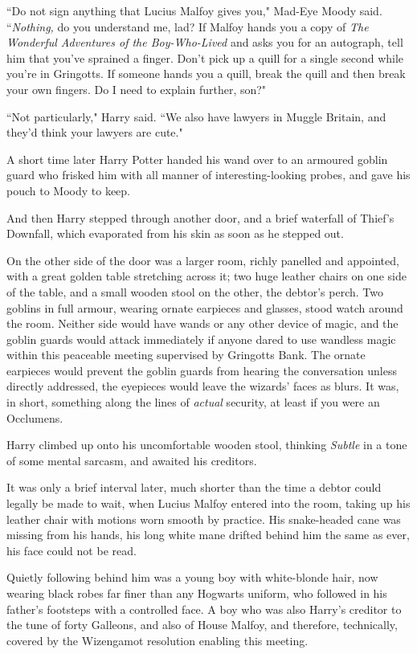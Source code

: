 ``Do not sign anything that Lucius Malfoy gives you," Mad-Eye Moody said. ``\emph{Nothing,} do you understand me, lad? If Malfoy hands you a copy of \emph{The Wonderful Adventures of the Boy-Who-Lived} and asks you for an autograph, tell him that you've sprained a finger. Don't pick up a quill for a single second while you're in Gringotts. If someone hands you a quill, break the quill and then break your own fingers. Do I need to explain further, son?"

``Not particularly," Harry said. ``We also have lawyers in Muggle Britain, and they'd think your lawyers are cute."

A short time later Harry Potter handed his wand over to an armoured goblin guard who frisked him with all manner of interesting-looking probes, and gave his pouch to Moody to keep.

And then Harry stepped through another door, and a brief waterfall of Thief's Downfall, which evaporated from his skin as soon as he stepped out.

On the other side of the door was a larger room, richly panelled and appointed, with a great golden table stretching across it; two huge leather chairs on one side of the table, and a small wooden stool on the other, the debtor's perch. Two goblins in full armour, wearing ornate earpieces and glasses, stood watch around the room. Neither side would have wands or any other device of magic, and the goblin guards would attack immediately if anyone dared to use wandless magic within this peaceable meeting supervised by Gringotts Bank. The ornate earpieces would prevent the goblin guards from hearing the conversation unless directly addressed, the eyepieces would leave the wizards' faces as blurs. It was, in short, something along the lines of \emph{actual} security, at least if you were an Occlumens.

Harry climbed up onto his uncomfortable wooden stool, thinking \emph{Subtle} in a tone of some mental sarcasm, and awaited his creditors.

It was only a brief interval later, much shorter than the time a debtor could legally be made to wait, when Lucius Malfoy entered into the room, taking up his leather chair with motions worn smooth by practice. His snake-headed cane was missing from his hands, his long white mane drifted behind him the same as ever, his face could not be read.

Quietly following behind him was a young boy with white-blonde hair, now wearing black robes far finer than any Hogwarts uniform, who followed in his father's footsteps with a controlled face. A boy who was also Harry's creditor to the tune of forty Galleons, and also of House Malfoy, and therefore, technically, covered by the Wizengamot resolution enabling this meeting.

